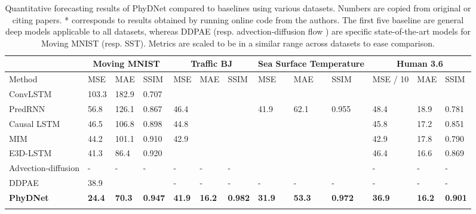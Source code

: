 \documentclass[10pt,twocolumn,letterpaper]{article}
\begin{document}
\begin{table*}[b]
    \begin{adjustbox}{max width=\textwidth}
    \begin{tabular}{l|lll|lll|lll|lll}
    \Xhline{2\arrayrulewidth}
     \multicolumn{1}{c}{} &  \multicolumn{3}{|c}{\textbf{Moving MNIST}} &  \multicolumn{3}{|c}{\textbf{Traffic BJ}} &  \multicolumn{3}{|c}{\textbf{Sea Surface Temperature}}  &  \multicolumn{3}{|c}{\textbf{Human 3.6}}  \\ 
     \hline
Method  & MSE & MAE & SSIM & MSE   & MAE & SSIM & MSE  & MAE & SSIM  & MSE  / 10 & MAE  & SSIM \\
      \hline \hline

    ConvLSTM \cite{xingjian2015convolutional} & 103.3 & 182.9 & 0.707  &  &  &  &  &  &  &   &  &   \\ 
    PredRNN \cite{wang2017predrnn}  & 56.8 & 126.1 & 0.867 & 46.4 &  &  & 41.9 & 62.1  & 0.955 & 48.4 & 18.9 & 0.781 \\ 
    Causal LSTM \cite{wang2018predrnn++}  & 46.5  & 106.8  & 0.898 & 44.8 &  &   &   &  &  & 45.8  & 17.2   & 0.851 \\     
    MIM \cite{wang2019memory}  & 44.2  & 101.1 & 0.910 & 42.9 &  &  &  &   &   & 42.9 & 17.8 & 0.790 \\
    E3D-LSTM \cite{wang2018eidetic}  & 41.3  & 86.4  & 0.920  &  &   &    &  &   &   & 46.4  & 16.6  & 0.869 \\ \hline
    Advection-diffusion \cite{de2017deep}  & -  &  - &    -& - & - &- &   &  &  & - & - &-  \\ 
    DDPAE \cite{hsieh2018learning}  & 38.9 &  &   & - &- &- &- &- &- &- &- &- \\ \hline
    \textbf{PhyDNet}  & \textbf{24.4} & \textbf{70.3} & \textbf{0.947} & \textbf{41.9} & \textbf{16.2} & \textbf{0.982}    & \textbf{31.9} & \textbf{53.3} & \textbf{0.972} & \textbf{36.9} & \textbf{16.2} & \textbf{0.901} \\ 
    \Xhline{2\arrayrulewidth}
    \end{tabular}
    \end{adjustbox}
    \caption{Quantitative forecasting results of PhyDNet compared to baselines using various datasets. Numbers are copied from original or citing papers. * corresponds to results obtained by running online code from the authors. The first five baseline are general deep models applicable to all datasets, whereas DDPAE \cite{hsieh2018learning} (resp. advection-diffusion flow \cite{de2017deep}) are specific state-of-the-art models for Moving MNIST (resp. SST). Metrics are scaled to be in a similar range across datasets to ease comparison.}
    \label{tab:res1}   
\end{table*}
\end{document}
